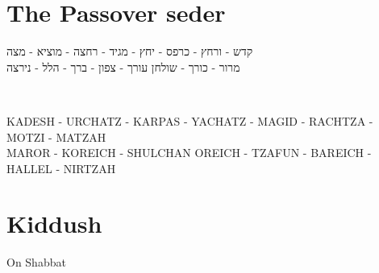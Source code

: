 \documentclass[extrafontsizes,twoside,17pt,a4paper,openany]{memoir}
\newcommand{\CH}{CH}
\newenvironment{HgHebrew}{\begin{hebrew}\noindent\large}{\end{hebrew}}
\newenvironment{HgTranslit}{\strut\\\noindent\begin{itshape}}{\end{itshape}\vspace{1em}}
\begin{document}
\chapter{The Passover seder}

\vfill

\vspace{-2em}
\begin{HgHebrew}
  \begin{center}
  קדש 
  -
  ורחץ
  -
  כרפס 
  -
  יחץ 
  -
  מגיד 
  -
  רחצה 
  -
  מוציא
  -
  מצה 
  \\
  מרור 
  -
  כורך 
  -
  שולחן עורך 
  -
  צפון
  -
  ברך 
  -
  הלל 
  -
  נירצה 
  \end{center}
\end{HgHebrew}
\vspace{-3em}
\begin{HgTranslit}
  \begin{center}
  {\small 
    KADESH - UR{\CH}ATZ - KARPAS - YA{\CH}ATZ - %
    MAGID - RA{\CH}TZA - MOTZI - MATZAH \\ 
    MAROR - KOREI{\CH} - SHUL{\CH}AN OREI{\CH} - %
    TZAFUN - BAREI{\CH} - HALLEL - NIRTZAH}
  \end{center}
\end{HgTranslit}



\newpage

{\small

\tableofcontents*
}
\newpage
\setcounter{page}{1}

\chapter{Kiddush}


\noindent
On Shabbat
\end{document}

